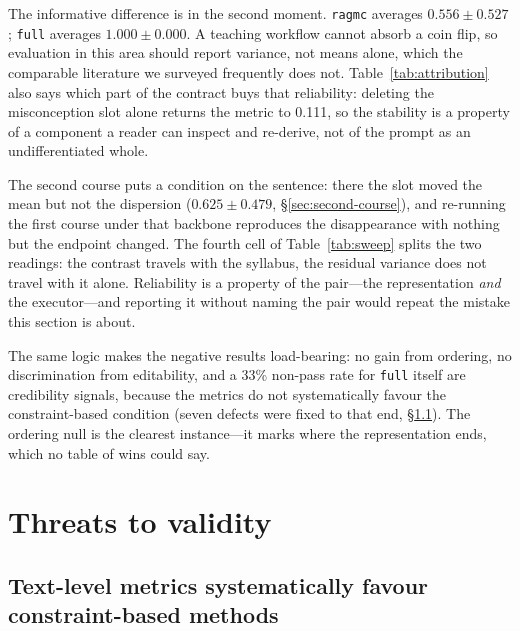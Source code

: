 \documentclass[review,12pt]{elsarticle}
\renewcommand{\_}{\kgunderscore\allowbreak}
\newcommand{\id}[1]{\texttt{#1}}
\begin{document}
The informative difference is in the second moment. \id{rag\_mc} averages
$0.556 \pm 0.527$; \id{full} averages $1.000 \pm 0.000$. A teaching workflow
cannot absorb a coin flip, so evaluation in this area should report variance,
not means alone, which the comparable literature we surveyed frequently does
not. Table~\ref{tab:attribution} also says which part of the contract buys
that reliability: deleting the misconception slot alone returns the metric to
0.111, so the stability is a property of a component a reader can inspect and
re-derive, not of the prompt as an undifferentiated whole.

The second course puts a condition on the sentence: there the slot moved the
mean but not the dispersion ($0.625 \pm 0.479$, \S\ref{sec:second-course}), and
re-running the first course under that backbone reproduces the disappearance with
nothing but the endpoint changed. The fourth cell of Table~\ref{tab:sweep} splits
the two readings: the contrast travels with the syllabus, the residual variance
does not travel with it alone. Reliability is a property of the pair---the
representation \emph{and} the executor---and reporting it without naming the pair
would repeat the mistake this section is about.

The same logic makes the negative results load-bearing: no gain from ordering, no
discrimination from editability, and a 33\% non-pass rate for \id{full} itself are
credibility signals, because the metrics do not systematically favour the
constraint-based condition (seven defects were fixed to that end,
\S\ref{sec:defects}). The ordering null is the clearest instance---it marks where
the representation ends, which no table of wins could say.

\section{Threats to validity}
\label{sec:threats}

\subsection{Text-level metrics systematically favour constraint-based methods}
\label{sec:defects}
\end{document}
